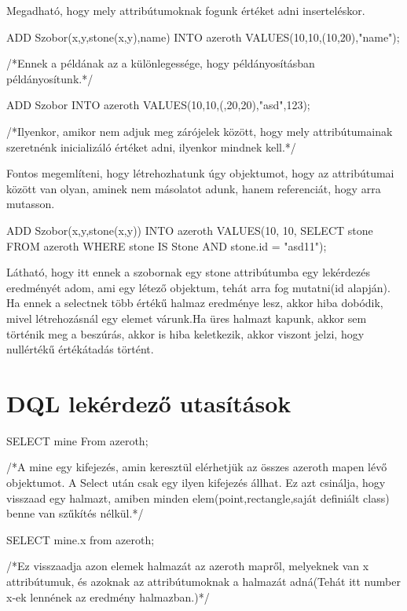 \begin{sql}
Megadható, hogy mely attribútumoknak fogunk értéket adni inserteléskor.
\begin{sql}
ADD Szobor(x,y,stone(x,y),name) INTO azeroth VALUES(10,10,(10,20),"name");
\end{sql}
/*Ennek a példának az a különlegessége, hogy példányosításban példányosítunk.*/

\begin{sql}
ADD Szobor INTO azeroth VALUES(10,10,(,20,20),"asd",123);
\end{sql}
/*Ilyenkor, amikor nem adjuk meg zárójelek között, hogy mely attribútumainak szeretnénk inicializáló értéket adni, ilyenkor mindnek kell.*/

Fontos megemlíteni, hogy létrehozhatunk úgy objektumot, hogy az attribútumai között van olyan, aminek nem másolatot adunk, hanem referenciát, hogy arra mutasson.
\begin{sql}
ADD Szobor(x,y,stone(x,y)) INTO azeroth VALUES(10, 10, SELECT stone FROM azeroth WHERE stone IS Stone AND stone.id = "asd11");
\end{sql}
Látható, hogy itt ennek a szobornak egy stone attribútumba egy lekérdezés eredményét adom, ami egy létező objektum, tehát arra fog mutatni(id alapján).
Ha ennek a selectnek több értékű halmaz eredménye lesz, akkor hiba dobódik, mivel létrehozásnál egy elemet várunk.Ha üres halmazt kapunk, akkor sem történik meg a beszúrás, akkor is hiba keletkezik, akkor viszont jelzi, hogy nullértékű értékátadás történt.

\section{DQL lekérdező utasítások}

\begin{sql}
SELECT mine From azeroth;
\end{sql}
/*A mine egy kifejezés, amin keresztül elérhetjük az összes  azeroth mapen lévő objektumot. A Select után csak egy ilyen kifejezés állhat. Ez azt csinálja, hogy visszaad egy halmazt, amiben minden elem(point,rectangle,saját definiált class) benne van szűkítés nélkül.*/
\begin{sql}
SELECT mine.x from azeroth;
\end{sql}
/*Ez visszaadja azon elemek halmazát az azeroth mapről, melyeknek van x attribútumuk, és azoknak az attribútumoknak a halmazát adná(Tehát itt number x-ek lennének az eredmény halmazban.)*/


\end{sql}
